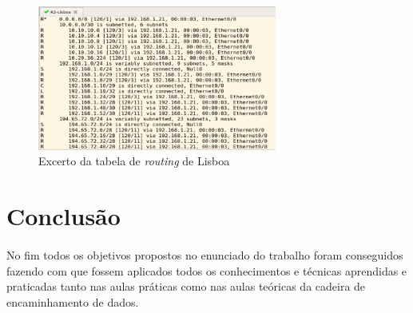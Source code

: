 \documentclass[11pt]{article}
\begin{document}
	\pagebreak 

	\begin{figure}[h]
		\centering
		\includegraphics[width=0.7\textwidth]{routing-lisboa}
		\caption{Excerto da tabela de \emph{routing} de Lisboa}
		\label{fig.nav}
	\end{figure}
	

    \pagebreak
	\large
	\section{Conclusão}
	\normalsize
	\paragraph{}
	No fim todos os objetivos propostos no enunciado do trabalho foram conseguidos fazendo com que fossem aplicados todos os conhecimentos e técnicas aprendidas e praticadas tanto nas aulas práticas como nas aulas teóricas da cadeira de encaminhamento de dados.
\end{document}
